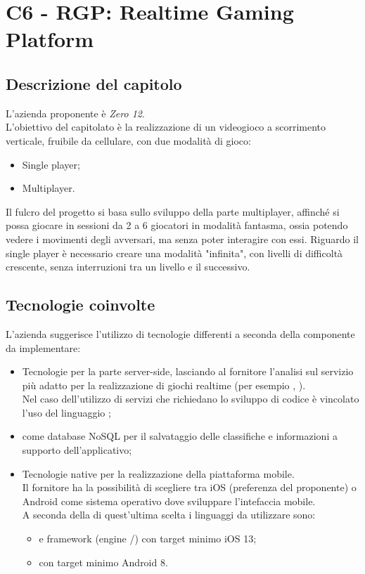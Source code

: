 \section{C6 - RGP: Realtime Gaming Platform}

\subsection{Descrizione del capitolo}
L'azienda proponente è \textit{Zero 12}. \\ 
L'obiettivo del capitolato è la realizzazione di un videogioco a scorrimento verticale, fruibile da cellulare, con due modalità di gioco:
\begin{itemize}
\item Single player;
\item Multiplayer.
\end{itemize}  
Il fulcro del progetto si basa sullo sviluppo della parte multiplayer, affinché si possa giocare in sessioni da 2 a 6 giocatori in modalità fantasma, ossia potendo vedere i movimenti degli avversari, ma senza poter interagire con essi.
Riguardo il single player è necessario creare una modalità "infinita", con livelli di difficoltà crescente, senza interruzioni tra un livello e il successivo.

\subsection{Tecnologie coinvolte}
L'azienda suggerisce l'utilizzo di tecnologie differenti a seconda della componente da implementare:
\begin{itemize}
\item Tecnologie  per la parte server-side, lasciando al fornitore l'analisi sul servizio più adatto per la realizzazione di giochi realtime (per esempio , ). \\
Nel caso dell'utilizzo di servizi che richiedano lo sviluppo di codice è vincolato l'uso del linguaggio ;
\item {} come database NoSQL per il salvataggio delle classifiche e informazioni a supporto dell'applicativo; 
\item Tecnologie native per la realizzazione della piattaforma mobile. \\ 
Il fornitore ha la possibilità di scegliere tra iOS (preferenza del proponente) o Android come sistema operativo dove sviluppare l'intefaccia mobile. \\
A seconda della di quest'ultima scelta i linguaggi da utilizzare sono:
\begin{itemize}
\item {} e framework  (engine /) con target minimo iOS 13;
\item {} con target minimo Android 8.
\end{itemize}
\end{itemize}

